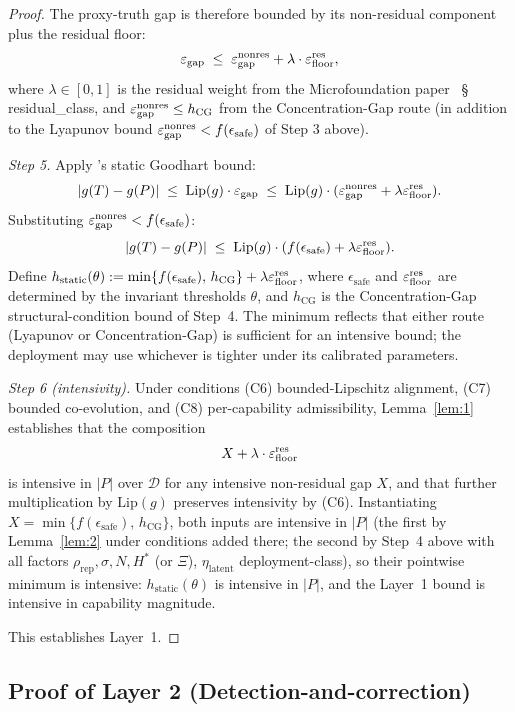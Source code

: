\begin{proof}
The proxy-truth gap is therefore bounded by its non-residual
component plus the residual floor:
\[
  \varepsilon_{\mathrm{gap}} \;\leq\; \varepsilon_{\mathrm{gap}}^{\mathrm{nonres}} + \lambda \cdot \varepsilon_{\mathrm{floor}}^{\mathrm{res}},
\]
where $\lambda \in [0,1]$ is the residual weight from the
Microfoundation paper~\citep{lasser2026micro} \S
residual\_class, and $\varepsilon_{\mathrm{gap}}^{\mathrm{nonres}} \leq h_{\mathrm{CG}}$ from the
Concentration-Gap route (in addition to the Lyapunov bound
$\varepsilon_{\mathrm{gap}}^{\mathrm{nonres}} < f(\epsilon_{\mathrm{safe}})$ of Step 3 above).

\emph{Step 5.} Apply \citep[Microfoundation]{lasser2026micro}'s static Goodhart bound:
\[
  |g(T) - g(P)| \;\leq\; \mathrm{Lip}(g) \cdot \varepsilon_{\mathrm{gap}}
  \;\leq\; \mathrm{Lip}(g) \cdot (\varepsilon_{\mathrm{gap}}^{\mathrm{nonres}} + \lambda \varepsilon_{\mathrm{floor}}^{\mathrm{res}}).
\]
Substituting $\varepsilon_{\mathrm{gap}}^{\mathrm{nonres}} < f(\epsilon_{\mathrm{safe}})$:
\[
  |g(T) - g(P)| \;\leq\; \mathrm{Lip}(g) \cdot
  (f(\epsilon_{\mathrm{safe}}) + \lambda \varepsilon_{\mathrm{floor}}^{\mathrm{res}}).
\]
Define
$h_{\mathrm{static}}(\theta) := \min\{f(\epsilon_{\mathrm{safe}}),\,
h_{\mathrm{CG}}\} + \lambda \varepsilon_{\mathrm{floor}}^{\mathrm{res}}$, where
$\epsilon_{\mathrm{safe}}$ and $\varepsilon_{\mathrm{floor}}^{\mathrm{res}}$ are determined by the
invariant thresholds $\theta$, and $h_{\mathrm{CG}}$ is the
Concentration-Gap structural-condition bound of Step~4.  The
minimum reflects that either route (Lyapunov or
Concentration-Gap) is sufficient for an intensive bound; the
deployment may use whichever is tighter under its calibrated
parameters.

\emph{Step 6 (intensivity).}  Under conditions (C6) bounded-Lipschitz
alignment, (C7) bounded co-evolution, and (C8) per-capability
admissibility, Lemma~\ref{lem:1} establishes that the composition
\[
  X + \lambda \cdot \varepsilon_{\mathrm{floor}}^{\mathrm{res}}
\]
is intensive in $|P|$ over $\mathcal{D}$ for any intensive
non-residual gap $X$, and that further multiplication by
$\mathrm{Lip}(g)$ preserves intensivity by (C6).  Instantiating
$X = \min\{f(\epsilon_{\mathrm{safe}}),\, h_{\mathrm{CG}}\}$,
both inputs are intensive in $|P|$ (the first by Lemma~\ref{lem:2}
under conditions added there; the second by Step~4 above with
all factors $\rho_{\mathrm{rep}}, \sigma, N, H^*$ (or $\Xi$),
$\eta_{\mathrm{latent}}$ deployment-class), so their pointwise
minimum is intensive: $h_{\mathrm{static}}(\theta)$ is intensive
in $|P|$, and the Layer~1 bound is intensive in capability
magnitude.

This establishes Layer~1.
\end{proof}

\subsection{Proof of Layer 2 (Detection-and-correction)}
\label{sec:proof_layer2}

